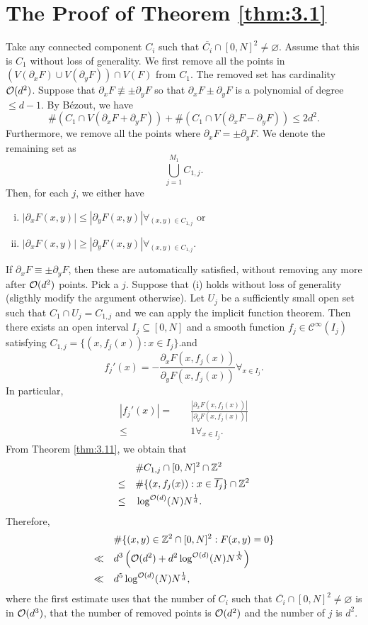 \documentclass{Vorlesungstemplate_English} %
\begin{document}
\section{The Proof of Theorem \ref{thm:3.1}}
\begin{pf}
  Take any connected component $C_i$ such that $\overline{C_i} \cap [0,N]^2 \neq \varnothing$. Assume that this is $C_1$ without loss of generality. We first remove all the points in $(V(\partial_xF) \cup V(\partial_yF))\cap V(F)$ from $C_1$. The removed set has cardinality $\mathcal{O}(d^2)$. Suppose that $\partial_xF \not\equiv \pm \partial_yF$ so that $\partial_xF \pm \partial_yF$ is a polynomial of degree $\leq d-1$. By Bézout, we have
  \[ \#(C_1 \cap V(\partial_xF + \partial_yF)) + \#(C_1 \cap V(\partial_xF-\partial_yF)) \leq 2d^2.\]
  Furthermore, we remove all the points where $\partial_xF=\pm\partial_yF$. We denote the remaining set as
  \[ \bigcup_{j=1}^{M_1} C_{1,j}.\]
  Then, for each $j$, we either have
  \begin{enumerate}[(i)]
    \item $|\partial_xF(x,y)| \leq |\partial_yF(x,y)| \forall_{(x,y) \in C_{1,j}}$ or
    \item $|\partial_xF(x,y)| \geq |\partial_yF(x,y)| \forall_{(x,y) \in C_{1,j}}$.
  \end{enumerate}
  If $\partial_xF \equiv \pm \partial_yF$, then these are automatically satisfied, without removing any more after $\mathcal{O}(d^2)$ points. Pick a $j$. Suppose that (i) holds without loss of generality (sligthly modify the argument otherwise). Let $U_j$ be a sufficiently small open set such that $C_1 \cap U_j = C_{1,j}$ and we can apply the implicit function theorem. Then there exists an open interval $I_j \subseteq [0,N]$ and a smooth function $f_j \in \mathcal{C}^{\infty}(I_j)$ satisfying $C_{1,j} = \{ (x,f_j(x)): x \in I_j\}$.and \[f_j'(x) = - \frac{\partial_xF(x,f_j(x))}{\partial_yF(x,f_j(x))} \forall_{x \in I_j}.\]
  In particular,
  \begin{align*}
    |f_j'(x)| = \quad & \frac{|\partial_xF(x,f_j(x))|}{|\partial_yF(x,f_j(x))|} \\
    \leq \quad & 1 \forall_{x \in I_j}.
  \end{align*}
  From Theorem \ref{thm:3.11}, we obtain that
  \begin{align*}
    & \#C_{1,j} \cap [0,N]^2\cap\mathbb{Z}^2 \\
    \leq \quad & \#\{ (x,f_j(x)): x \in \overline{I_j}\} \cap \mathbb{Z}^2 \\
    \leq \quad & \log^{\mathcal{O}(d)}(N)N^{\frac{1}{d}}.
  \end{align*}
  Therefore,
  \begin{align*}
    & \#\{ (x,y) \in \mathbb{Z}^2 \cap [0,N]^2: F(x,y) = 0\} \\
    \ll \quad & d^3\left(\mathcal{O}(d^2) + d^2\log^{\mathcal{O}(d)}(N)N^{\frac{1}{N}}\right) \\
    \ll \quad & d^5\log^{\mathcal{O}(d)}(N)N^{\frac{1}{d}},
  \end{align*}
  where the first estimate uses that the number of $C_i$ such that $\overline{C_i} \cap [0,N]^2 \neq \varnothing$ is in $\mathcal{O}(d^3)$, that the number of removed points is $\mathcal{O}(d^2)$ and the number of $j$ is $d^2$.
\end{pf}
\end{document}
